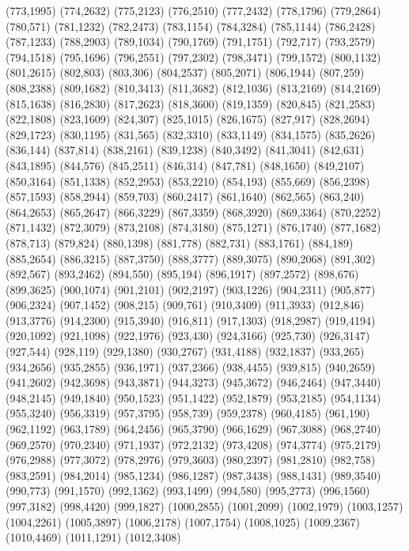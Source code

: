 (773,1995)
(774,2632)
(775,2123)
(776,2510)
(777,2432)
(778,1796)
(779,2864)
(780,571)
(781,1232)
(782,2473)
(783,1154)
(784,3284)
(785,1144)
(786,2428)
(787,1233)
(788,2903)
(789,1034)
(790,1769)
(791,1751)
(792,717)
(793,2579)
(794,1518)
(795,1696)
(796,2551)
(797,2302)
(798,3471)
(799,1572)
(800,1132)
(801,2615)
(802,803)
(803,306)
(804,2537)
(805,2071)
(806,1944)
(807,259)
(808,2388)
(809,1682)
(810,3413)
(811,3682)
(812,1036)
(813,2169)
(814,2169)
(815,1638)
(816,2830)
(817,2623)
(818,3600)
(819,1359)
(820,845)
(821,2583)
(822,1808)
(823,1609)
(824,307)
(825,1015)
(826,1675)
(827,917)
(828,2694)
(829,1723)
(830,1195)
(831,565)
(832,3310)
(833,1149)
(834,1575)
(835,2626)
(836,144)
(837,814)
(838,2161)
(839,1238)
(840,3492)
(841,3041)
(842,631)
(843,1895)
(844,576)
(845,2511)
(846,314)
(847,781)
(848,1650)
(849,2107)
(850,3164)
(851,1338)
(852,2953)
(853,2210)
(854,193)
(855,669)
(856,2398)
(857,1593)
(858,2944)
(859,703)
(860,2417)
(861,1640)
(862,565)
(863,240)
(864,2653)
(865,2647)
(866,3229)
(867,3359)
(868,3920)
(869,3364)
(870,2252)
(871,1432)
(872,3079)
(873,2108)
(874,3180)
(875,1271)
(876,1740)
(877,1682)
(878,713)
(879,824)
(880,1398)
(881,778)
(882,731)
(883,1761)
(884,189)
(885,2654)
(886,3215)
(887,3750)
(888,3777)
(889,3075)
(890,2068)
(891,302)
(892,567)
(893,2462)
(894,550)
(895,194)
(896,1917)
(897,2572)
(898,676)
(899,3625)
(900,1074)
(901,2101)
(902,2197)
(903,1226)
(904,2311)
(905,877)
(906,2324)
(907,1452)
(908,215)
(909,761)
(910,3409)
(911,3933)
(912,846)
(913,3776)
(914,2300)
(915,3940)
(916,811)
(917,1303)
(918,2987)
(919,4194)
(920,1092)
(921,1098)
(922,1976)
(923,430)
(924,3166)
(925,730)
(926,3147)
(927,544)
(928,119)
(929,1380)
(930,2767)
(931,4188)
(932,1837)
(933,265)
(934,2656)
(935,2855)
(936,1971)
(937,2366)
(938,4455)
(939,815)
(940,2659)
(941,2602)
(942,3698)
(943,3871)
(944,3273)
(945,3672)
(946,2464)
(947,3440)
(948,2145)
(949,1840)
(950,1523)
(951,1422)
(952,1879)
(953,2185)
(954,1134)
(955,3240)
(956,3319)
(957,3795)
(958,739)
(959,2378)
(960,4185)
(961,190)
(962,1192)
(963,1789)
(964,2456)
(965,3790)
(966,1629)
(967,3088)
(968,2740)
(969,2570)
(970,2340)
(971,1937)
(972,2132)
(973,4208)
(974,3774)
(975,2179)
(976,2988)
(977,3072)
(978,2976)
(979,3603)
(980,2397)
(981,2810)
(982,758)
(983,2591)
(984,2014)
(985,1234)
(986,1287)
(987,3438)
(988,1431)
(989,3540)
(990,773)
(991,1570)
(992,1362)
(993,1499)
(994,580)
(995,2773)
(996,1560)
(997,3182)
(998,4420)
(999,1827)
(1000,2855)
(1001,2099)
(1002,1979)
(1003,1257)
(1004,2261)
(1005,3897)
(1006,2178)
(1007,1754)
(1008,1025)
(1009,2367)
(1010,4469)
(1011,1291)
(1012,3408)
